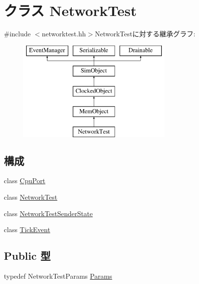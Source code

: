 \hypertarget{classNetworkTest}{
\section{クラス NetworkTest}
\label{classNetworkTest}
}


{\ttfamily \#include $<$networktest.hh$>$}NetworkTestに対する継承グラフ:\begin{figure}[H]
\begin{center}
\leavevmode
\includegraphics[height=5cm]{classNetworkTest}
\end{center}
\end{figure}
\subsection*{構成}
\begin{DoxyCompactItemize}
\item 
class \hyperlink{classNetworkTest_1_1CpuPort}{CpuPort}
\item 
class \hyperlink{classNetworkTest_1_1NetworkTest}{NetworkTest}
\item 
class \hyperlink{classNetworkTest_1_1NetworkTestSenderState}{NetworkTestSenderState}
\item 
class \hyperlink{classNetworkTest_1_1TickEvent}{TickEvent}
\end{DoxyCompactItemize}
\subsection*{Public 型}
\begin{DoxyCompactItemize}
\item 
typedef NetworkTestParams \hyperlink{classNetworkTest_aa26fd7704e843bb985048632459a664e}{Params}
\end{DoxyCompactItemize}
